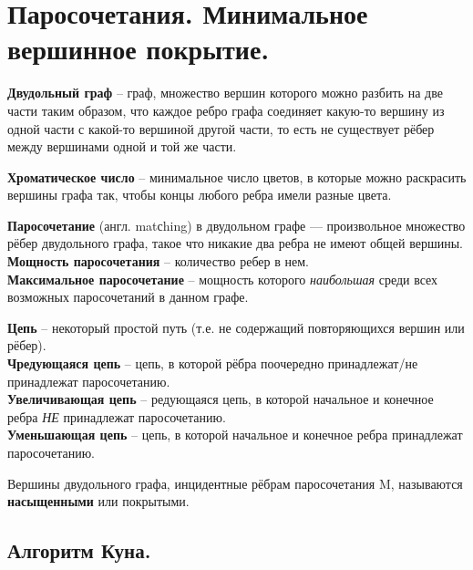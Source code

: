 \section{Паросочетания. Минимальное вершинное покрытие.}%
\label{sec:1. Паросочетания. Минимальное вершинное покрытие.}

\begin{Def}
	\textbf{Двудольный граф} -- граф, множество вершин которого можно разбить на две части таким образом, что каждое ребро графа соединяет какую-то вершину из одной части с какой-то вершиной другой части, то есть не существует рёбер между вершинами одной и той же части.
\end{Def}

\begin{Def}
	\textbf{Хроматическое число} -- минимальное число цветов, в которые можно раскрасить вершины графа так, чтобы концы любого ребра имели разные цвета.
\end{Def}

\begin{Def}
	\textbf{Паросочетание} (англ. matсhing) в двудольном графе — произвольное множество рёбер двудольного графа, такое что никакие два ребра не имеют общей вершины.\\
	\textbf{Мощность паросочетания} -- количество ребер в нем.\\
	\textbf{Максимальное паросочетание} -- мощность которого \textit{наибольшая} среди всех возможных паросочетаний в данном графе.
\end{Def}

\begin{Def}
	\textbf{Цепь} -- некоторый простой путь (т.е. не содержащий повторяющихся вершин или рёбер).\\
	\textbf{Чредующаяся цепь} -- цепь, в которой рёбра поочередно принадлежат/не принадлежат паросочетанию.\\
	\textbf{Увеличивающая цепь} -- редующаяся цепь, в которой начальное и конечное ребра \textit{НЕ} принадлежат паросочетанию.\\
	\textbf{Уменьшающая цепь} -- цепь, в которой начальное и конечное ребра принадлежат паросочетанию.
\end{Def}

\begin{Def}
	Вершины двудольного графа, инцидентные рёбрам паросочетания M, называются \textbf{насыщенными} или покрытыми. \\
\end{Def}

\subsection*{Алгоритм Куна.}%
\label{sub:Алгоритм Куна.}

